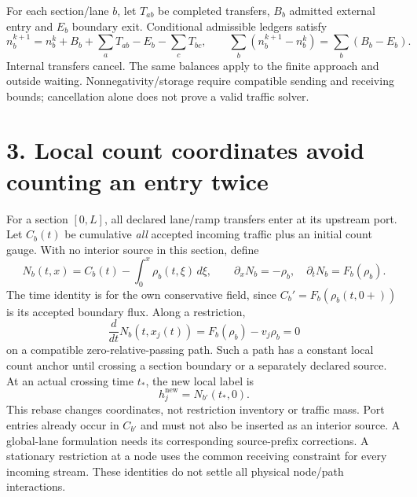 \documentclass[11pt,a4paper]{article}
\begin{document}
For each section/lane $b$, let $T_{a b}$ be completed transfers, $B_b$ admitted
external entry and $E_b$ boundary exit. Conditional admissible ledgers satisfy
\begin{equation}
 n_b^{k+1}=n_b^k+B_b+\sum_a T_{a b}-E_b-\sum_c T_{b c},\qquad
 \sum_b(n_b^{k+1}-n_b^k)=\sum_b(B_b-E_b).
\end{equation}
Internal transfers cancel. The same balances apply to the finite approach
and outside waiting. Nonnegativity/storage require compatible sending and
receiving bounds; cancellation alone does not prove a valid traffic solver.

\newpage
\section*{3. Local count coordinates avoid counting an entry twice}
For a section $[0,L]$, all declared lane/ramp transfers enter at its upstream
port. Let $C_b(t)$ be cumulative \emph{all} accepted incoming traffic plus an
initial count gauge. With no interior source in this section, define
\begin{equation}
 N_b(t,x)=C_b(t)-\int_0^x\rho_b(t,\xi)\,d\xi,\qquad
 \partial_xN_b=-\rho_b,\quad \partial_tN_b=F_b(\rho_b).
\end{equation}
The time identity is for the own conservative field, since
$C_b'=F_b(\rho_b(t,0+))$ is its accepted boundary flux. Along a restriction,
\begin{equation}
 \frac{d}{dt}N_b(t,x_j(t))=F_b(\rho_b)-v_j\rho_b=0
\end{equation}
on a compatible zero-relative-passing path. Such a path has a constant local
count anchor until crossing a section boundary or a separately declared source.
At an actual crossing time $t_*$, the new local label is
\begin{equation}
 h_j^{\mathrm{new}}=N_{b'}(t_*,0).
\end{equation}
This rebase changes coordinates, not restriction inventory or traffic mass.
Port entries already occur in $C_{b'}$ and must not also be inserted as an
interior source. A global-lane formulation needs its corresponding source-prefix
corrections. A stationary restriction at a node uses the common receiving
constraint for every incoming stream. These identities do not settle all
physical node/path interactions.
\end{document}

